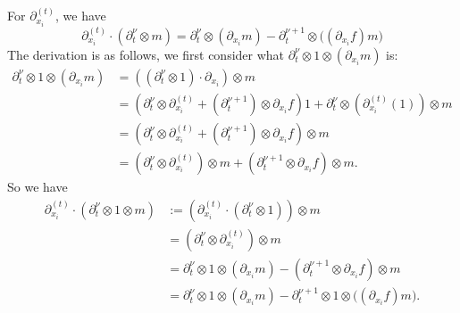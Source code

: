 \begin{example}
\begin{enumerate}
              For $\partial^{(t)}_{x_i}$, we have
              \[
                  \partial^{(t)}_{x_i}\cdot(\partial_t^\nu\otimes m) = \partial_t^\nu\otimes(\partial_{x_i}m) - \partial_t^{\nu+1}\otimes\bigl((\partial_{x_i}f)m\bigr)
              \]
              The derivation is as follows, we first consider what $\partial_t^\nu\otimes 1 \otimes (\partial_{x_i}m)$ is:
              \begin{align*}
                  \partial_t^\nu\otimes 1 \otimes (\partial_{x_i}m) & = ((\partial_t^\nu\otimes 1)\cdot\partial_{x_i})\otimes m                                                                                                  \\
                                                                    & = (\partial_t^\nu \otimes \partial^{(t)}_{x_i} + (\partial_t^{\nu+1})\otimes \partial_{x_i}f)1 + \partial_t^\nu \otimes (\partial^{(t)}_{x_i}(1))\otimes m \\
                                                                    & = (\partial_t^\nu \otimes \partial^{(t)}_{x_i} + (\partial_t^{\nu+1})\otimes \partial_{x_i}f)\otimes m                                                     \\
                                                                    & =  (\partial_t^\nu \otimes \partial^{(t)}_{x_i})\otimes m + (\partial_t^{\nu+1}\otimes \partial_{x_i}f)\otimes m.
              \end{align*}
              So we have
              \begin{align*}
                  \partial^{(t)}_{x_i}\cdot(\partial_t^\nu\otimes 1\otimes m) & := (\partial^{(t)}_{x_i}\cdot(\partial_t^\nu\otimes 1))\otimes m                                                        \\
                                                                              & =(\partial_t^\nu \otimes \partial^{(t)}_{x_i})\otimes m                                                                 \\
                                                                              & = \partial_t^\nu\otimes 1 \otimes (\partial_{x_i}m) - (\partial_t^{\nu+1}\otimes \partial_{x_i}f)\otimes m              \\
                                                                              & =\partial_t^\nu\otimes 1 \otimes (\partial_{x_i}m) - \partial_t^{\nu+1}\otimes 1\otimes \bigl((\partial_{x_i}f)m\bigr).
              \end{align*}



\end{enumerate}
\end{example}
